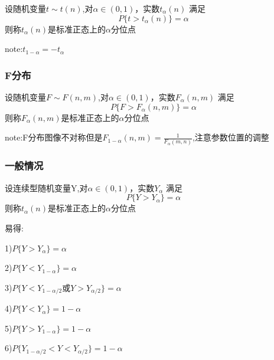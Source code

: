 \documentclass[11pt,twoside,a4paper]{ctexart}
\begin{document}
设随机变量$t\sim t(n)$,对$\alpha \in (0,1)$，实数$t_\alpha(n)$ 满足
\[P\{t > t_\alpha(n)\} = \alpha\]
则称$t_\alpha(n) $是标准正态上的$\alpha$分位点

note:$t_{1 - \alpha} = -t_\alpha $

\subsubsection{F分布}

设随机变量$F\sim F(n,m)$,对$\alpha \in (0,1)$，实数$F_\alpha(n,m)$ 满足
\[P\{F > F_\alpha(n,m)\} = \alpha\]
则称$F_\alpha(n,m) $是标准正态上的$\alpha$分位点

note:F分布图像不对称但是$F_{1 - \alpha}(n,m) = \frac{1}{F_\alpha (m,n)}$,注意参数位置的调整

\subsubsection{一般情况}
设连续型随机变量Y,对$\alpha \in (0,1)$，实数$Y_\alpha$ 满足
\[P\{Y > Y_\alpha\} = \alpha\]
则称$t_\alpha(n) $是标准正态上的$\alpha$分位点

易得:
\begin{minipage}[t]{0.9\linewidth}

    1)$P\{Y > Y_\alpha\} = \alpha $

    2)$P\{Y < Y_{1 - \alpha}\} = \alpha$

    3)$P\{Y < Y_{1 - \alpha/2} \text{或} Y > Y_{\alpha/2}\} = \alpha$

    4)$P\{Y < Y_ \alpha\} =1 - \alpha$

    5)$P\{Y > Y_{1 - \alpha}\} = 1 - \alpha$

    6)$P\{Y_{1 - \alpha /2} < Y < Y_{\alpha/2}\} = 1 - \alpha$
    
\end{minipage}
\end{document}
